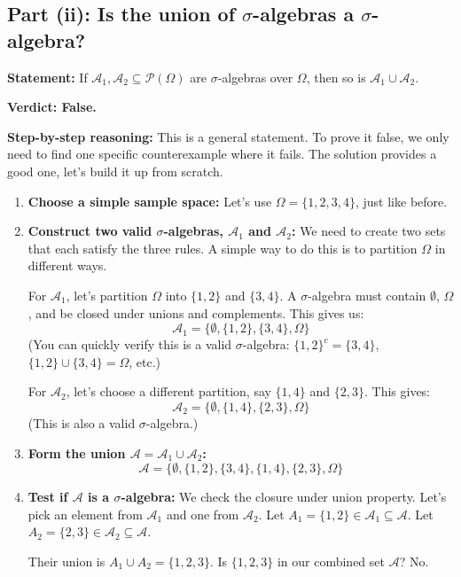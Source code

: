 \documentclass[11pt,a4paper]{article}
\begin{document}
\subsection{Part (ii): Is the union of \texorpdfstring{$\sigma$}{sigma}-algebras a \texorpdfstring{$\sigma$}{sigma}-algebra?}
\textbf{Statement:} If $\mathcal{A}_1, \mathcal{A}_2 \subseteq \mathcal{P}(\Omega)$ are $\sigma$-algebras over $\Omega$, then so is $\mathcal{A}_1 \cup \mathcal{A}_2$.

\textbf{Verdict: False.}

\textbf{Step-by-step reasoning:}
This is a general statement. To prove it false, we only need to find one specific counterexample where it fails. The solution provides a good one, let's build it up from scratch.

\begin{enumerate}
    \item \textbf{Choose a simple sample space:} Let's use $\Omega = \{1,2,3,4\}$, just like before.

    \item \textbf{Construct two valid $\sigma$-algebras, $\mathcal{A}_1$ and $\mathcal{A}_2$:}
    We need to create two sets that each satisfy the three rules. A simple way to do this is to partition $\Omega$ in different ways.

    For $\mathcal{A}_1$, let's partition $\Omega$ into $\{1,2\}$ and $\{3,4\}$. A $\sigma$-algebra must contain $\emptyset$, $\Omega$, and be closed under unions and complements. This gives us:
    \[ \mathcal{A}_1 = \{\emptyset, \{1,2\}, \{3,4\}, \Omega\} \]
    (You can quickly verify this is a valid $\sigma$-algebra: $\{1,2\}^c = \{3,4\}$, $\{1,2\} \cup \{3,4\} = \Omega$, etc.)

    For $\mathcal{A}_2$, let's choose a different partition, say $\{1,4\}$ and $\{2,3\}$. This gives:
    \[ \mathcal{A}_2 = \{\emptyset, \{1,4\}, \{2,3\}, \Omega\} \]
    (This is also a valid $\sigma$-algebra.)

    \item \textbf{Form the union $\mathcal{A} = \mathcal{A}_1 \cup \mathcal{A}_2$:}
    \[ \mathcal{A} = \{\emptyset, \{1,2\}, \{3,4\}, \{1,4\}, \{2,3\}, \Omega\} \]

    \item \textbf{Test if $\mathcal{A}$ is a $\sigma$-algebra:} We check the closure under union property.
    Let's pick an element from $\mathcal{A}_1$ and one from $\mathcal{A}_2$.
    Let $A_1 = \{1,2\} \in \mathcal{A}_1 \subseteq \mathcal{A}$.
    Let $A_2 = \{2,3\} \in \mathcal{A}_2 \subseteq \mathcal{A}$.

    Their union is $A_1 \cup A_2 = \{1,2,3\}$.
    Is $\{1,2,3\}$ in our combined set $\mathcal{A}$? No.
\end{enumerate}
\end{document}
